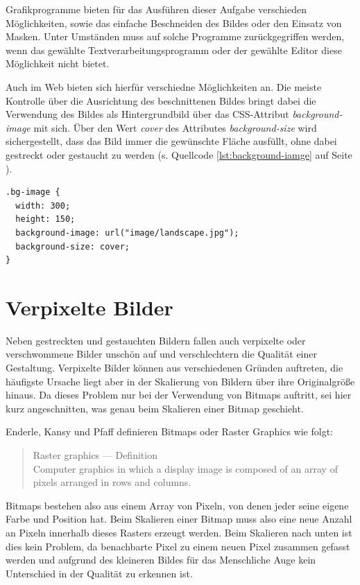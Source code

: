 Grafikprogramme bieten für das Ausführen dieser Aufgabe verschieden Möglichkeiten, sowie das einfache Beschneiden des Bildes oder den Einsatz von Masken. Unter Umständen muss auf solche Programme zurückgegriffen werden, wenn das gewählte Textverarbeitungsprogramm oder der gewählte Editor diese Möglichkeit nicht bietet.

Auch im Web bieten sich hierfür verschiedne Möglichkeiten an. Die meiste Kontrolle über die Ausrichtung des beschnittenen Bildes bringt dabei die Verwendung des Bildes als Hintergrundbild über das CSS-Attribut \textit{background-image} mit sich. Über den Wert \textit{cover} des Attributes \textit{background-size} wird sichergestellt, dass das Bild immer die gewünschte Fläche ausfüllt, ohne dabei gestreckt oder gestaucht zu werden (s. Quellcode \ref{lst:background-iamge} auf Seite \pageref{lst:background-iamge}).

\begin{lstlisting}[caption={Verwendung eines Hintergrundbildes in CSS},label={lst:background-iamge}]
.bg-image {
  width: 300;
  height: 150;
  background-image: url("image/landscape.jpg");
  background-size: cover;
}
\end{lstlisting}

\section{Verpixelte Bilder}
Neben gestreckten und gestauchten Bildern fallen auch verpixelte oder verschwommene Bilder unschön auf und verschlechtern die Qualität einer Gestaltung. Verpixelte Bilder können aus verschiedenen Gründen auftreten, die häufigste Ursache liegt aber in der Skalierung von Bildern über ihre Originalgröße hinaus. 
Da dieses Problem nur bei der Verwendung von Bitmaps auftritt, sei hier kurz angeschnitten, was genau beim Skalieren einer Bitmap geschieht.

Enderle, Kansy und Pfaff definieren Bitmaps oder Raster Graphics wie folgt:

\begin{quote}
Raster graphics — Definition \\
Computer graphics in which a display image is composed of an array of pixels arranged in rows and columns. \cite{enderle2012computer}
\end{quote}

Bitmaps bestehen also aus einem Array von Pixeln, von denen jeder seine eigene Farbe und Position hat.
Beim Skalieren einer Bitmap muss also eine neue Anzahl an Pixeln innerhalb dieses Rasters erzeugt werden. Beim Skalieren nach unten ist dies kein Problem, da benachbarte Pixel zu einem neuen Pixel zusammen gefasst werden und aufgrund des kleineren Bildes für das Menschliche Auge kein Unterschied in der Qualität zu erkennen ist.

